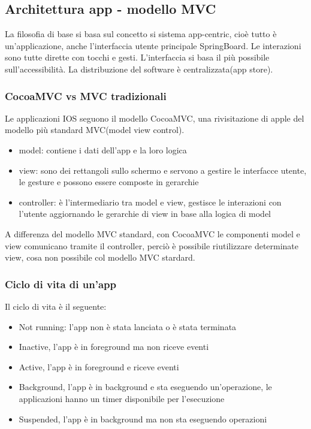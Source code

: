 \documentclass{report}
\begin{document}
\subsection{Architettura app - modello MVC}
La filosofia di base si basa sul concetto si sistema app-centric, cioè tutto è un’applicazione, anche
l’interfaccia utente principale SpringBoard. Le interazioni sono tutte dirette con tocchi e gesti.
L’interfaccia si basa il più possibile sull’accessibilità. La distribuzione del software è centralizzata(app store).
\subsubsection{CocoaMVC vs MVC tradizionali}
Le applicazioni IOS seguono il modello CocoaMVC, una rivisitazione di apple del modello più standard MVC(model view control).
\begin{itemize}
    \item model: contiene i dati dell’app e la loro logica
    \item view: sono dei rettangoli sullo schermo e servono a gestire le interfacce utente, le gesture e possono essere composte in gerarchie
    \item controller: è l’intermediario tra model e view, gestisce le interazioni con l'utente aggiornando le gerarchie di view in base alla logica di model

\end{itemize}
A differenza del modello MVC standard, con CocoaMVC le componenti model e view comunicano tramite il controller, perciò è possibile riutilizzare determinate view, cosa non possibile col modello MVC stardard.
\subsubsection{Ciclo di vita di un'app}
Il ciclo di vita è il seguente:
\begin{itemize}
    \item Not running: l’app non è stata lanciata o è stata terminata
    \item Inactive, l’app è in foreground ma non riceve eventi
    \item Active, l’app è in foreground e riceve eventi
    \item Background, l’app è in background e sta eseguendo un’operazione, le applicazioni hanno un
    timer disponibile per l’esecuzione
    \item Suspended, l’app è in background ma non sta eseguendo operazioni
\end{itemize}
\end{document}
